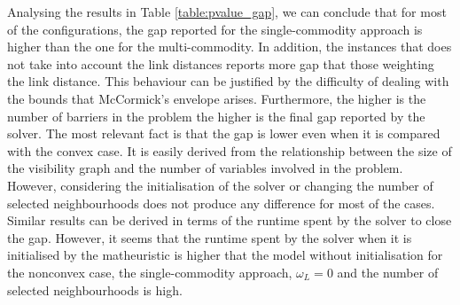 \documentclass[a4paper,  review, authoryear, 1p.]{elsarticle}
\newcommand{\KMPHN}{{\sf{H-KMPHN}}}
\begin{document}
{		Analysing the results in Table \ref{table:pvalue_gap}, we can conclude that for most of the configurations, the gap reported for the single-commodity approach is higher than the one for the multi-commodity. In addition, the instances that does not take into account the link distances reports more gap that those weighting the link distance. This behaviour can be justified by the difficulty of dealing with the bounds that McCormick's envelope arises. Furthermore, the higher is the number of barriers in the problem the higher is the final gap reported by the solver. The most relevant fact is that the gap is lower even when it is compared with the convex case. It is easily derived from the relationship between the size of the visibility graph and the number of variables involved in the problem. However, considering the initialisation of the solver or changing the number of selected neighbourhoods does not produce any difference for most of the cases.  Similar results can be derived in terms of the runtime spent by the solver to close the gap. However, it seems that the runtime spent by the solver when it is initialised by the matheuristic is higher that the model without initialisation for the nonconvex case, the single-commodity approach, $\omega_L=0$ and the number of selected neighbourhoods is high.}

		
\end{document}
